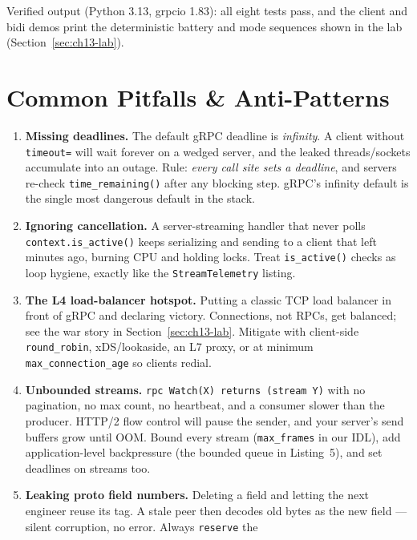 Verified output (Python 3.13, grpcio 1.83): all eight tests pass, and the
client and bidi demos print the deterministic battery and mode sequences shown
in the lab (Section~\ref{sec:ch13-lab}).

\section{Common Pitfalls \& Anti-Patterns}
\label{sec:ch13-pitfalls}
\begin{enumerate}
  \item \textbf{Missing deadlines.} The default gRPC deadline is
        \emph{infinity}. A client without \texttt{timeout=} will wait forever
        on a wedged server, and the leaked threads/sockets accumulate into an
        outage. Rule: \emph{every call site sets a deadline}, and servers
        re-check \texttt{time\_remaining()} after any blocking step. gRPC's
        infinity default is the single most dangerous default in the stack.
  \item \textbf{Ignoring cancellation.} A server-streaming handler that never
        polls \texttt{context.is\_active()} keeps serializing and sending to a
        client that left minutes ago, burning CPU and holding locks. Treat
        \texttt{is\_active()} checks as loop hygiene, exactly like the
        \texttt{StreamTelemetry} listing.
  \item \textbf{The L4 load-balancer hotspot.} Putting a classic TCP load
        balancer in front of gRPC and declaring victory. Connections, not
        RPCs, get balanced; see the war story in Section~\ref{sec:ch13-lab}.
        Mitigate with client-side \texttt{round\_robin}, xDS/lookaside, an L7
        proxy, or at minimum \texttt{max\_connection\_age} so clients redial.
  \item \textbf{Unbounded streams.} \texttt{rpc Watch(X) returns (stream Y)}
        with no pagination, no max count, no heartbeat, and a consumer slower
        than the producer. HTTP/2 flow control will pause the sender, and your
        server's send buffers grow until OOM. Bound every stream
        (\texttt{max\_frames} in our IDL), add application-level backpressure
        (the bounded queue in Listing~5), and set deadlines on streams too.
  \item \textbf{Leaking proto field numbers.} Deleting a field and letting the
        next engineer reuse its tag. A stale peer then decodes old bytes as the
        new field --- silent corruption, no error. Always \texttt{reserve} the

\end{enumerate}
